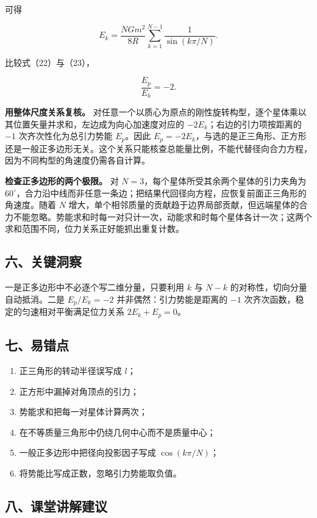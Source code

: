 \documentclass[12pt,a4paper,UTF8]{ctexart}
\newcommand{\tightlist}{\setlength{\itemsep}{0pt}\setlength{\parskip}{0pt}}
\begin{document}
可得

\[
E_k
=\frac{NGm^2}{8R}
\sum_{k=1}^{N-1}\frac1{\sin(k\pi/N)}.
\tag{23}
\]

比较式（22）与（23），

\[
\boxed{\frac{E_p}{E_k}=-2}.
\tag{24}
\]

\textbf{用整体尺度关系复核。}
对任意一个以质心为原点的刚性旋转构型，逐个星体乘以其位置矢量并求和，左边成为向心加速度对应的
\(-2E_k\)；右边的引力项按距离的 \(-1\) 次齐次性化为总引力势能
\(E_p\)。因此
\(E_p=-2E_k\)，与选的是正三角形、正方形还是一般正多边形无关。这个关系只能核查总能量比例，不能代替径向合力方程，因为不同构型的角速度仍需各自计算。

\textbf{检查正多边形的两个极限。} 对
\(N=3\)，每个星体所受其余两个星体的引力夹角为
\(60^\circ\)，合力沿中线而非任意一条边；把结果代回径向方程，应恢复前面正三角形的角速度。随着
\(N\)
增大，单个相邻质量的贡献趋于边界局部贡献，但远端星体的合力不能忽略。势能求和时每一对只计一次，动能求和时每个星体各计一次；这两个求和范围不同，位力关系正好能抓出重复计数。

\subsection{六、关键洞察}\label{ux516dux5173ux952eux6d1eux5bdf-1}

一是正多边形中不必逐个写二维分量，只要利用 \(k\) 与 \(N-k\)
的对称性，切向分量自动抵消。二是 \(E_p/E_k=-2\)
并非偶然：引力势能是距离的 \(-1\)
次齐次函数，稳定的匀速相对平衡满足位力关系 \(2E_k+E_p=0\)。

\subsection{七、易错点}\label{ux4e03ux6613ux9519ux70b9-1}

\begin{enumerate}
\def\labelenumi{\arabic{enumi}.}
\tightlist
\item
  正三角形的转动半径误写成 \(l\)；
\item
  正方形中漏掉对角顶点的引力；
\item
  势能求和把每一对星体计算两次；
\item
  在不等质量三角形中仍绕几何中心而不是质量中心；
\item
  一般正多边形中把径向投影因子写成 \(\cos(k\pi/N)\)；
\item
  将势能比写成正数，忽略引力势能取负值。
\end{enumerate}

\subsection{八、课堂讲解建议}\label{ux516bux8bfeux5802ux8bb2ux89e3ux5efaux8bae-1}
\end{document}
